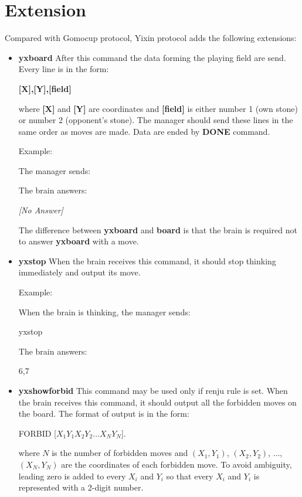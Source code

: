\documentclass[a4paper,12pt]{article}
\begin{document}
\section{Extension}
Compared with Gomocup protocol, Yixin protocol adds the following extensions:
\begin{itemize}
\item \textbf{yxboard}
After this command the data forming the playing field are send. Every line is in the form:

\fbox
{
\textbf{[X],[Y],[field]}
}

where \textbf{[X]} and \textbf{[Y]} are coordinates and \textbf{[field]} is either number 1 (own stone) or number 2 (opponent's stone). The manager should send these lines in the same order as moves are made. Data are ended by \textbf{DONE} command. 

Example: 

The manager sends:

\fbox
{
}

The brain answers:

\fbox
{
\textit{[No Answer]}
}

The difference between \textbf{yxboard} and \textbf{board} is that the brain is required not to answer \textbf{yxboard} with a move.

\item \textbf{yxstop}
When the brain receives this command, it should stop thinking immediately and output its move.

Example:

When the brain is thinking, the manager sends:

\fbox
{
yxstop
}

The brain answers:

\fbox
{
6,7
}

\item \textbf{yxshowforbid}
This command may be used only if renju rule is set. When the brain receives this command, it should output all the forbidden moves on the board. The format of output is in the form:

\fbox
{
FORBID [$X_1Y_1X_2Y_2\ldots X_NY_N$].
}

where $N$ is the number of forbidden moves and $(X_1,Y_1)$, $(X_2,Y_2)$, $\ldots$, $(X_N,Y_N)$ are the coordinates of each forbidden move. To avoid ambiguity, leading zero is added to every $X_i$ and $Y_i$ so that every $X_i$ and $Y_i$ is represented with a 2-digit number.


\end{itemize}
\end{document}

